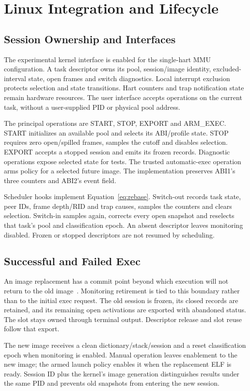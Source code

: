 \section{Linux Integration and Lifecycle}
\label{sec:linux}
\subsection{Session Ownership and Interfaces}
The experimental kernel interface is enabled for the single-hart MMU configuration. A task descriptor owns its pool, session/image identity, excluded-interval state, open frames and switch diagnostics. Local interrupt exclusion protects selection and state transitions. Hart counters and trap notification state remain hardware resources. The user interface accepts operations on the current task, without a user-supplied PID or physical pool address.

The principal operations are START, STOP, EXPORT and ARM\_EXEC. START initializes an available pool and selects its ABI/profile state. STOP requires zero open/spilled frames, samples the cutoff and disables selection. EXPORT accepts a stopped session and emits its frozen records. Diagnostic operations expose selected state for tests. The trusted automatic-exec operation arms policy for a selected future image. The implementation preserves ABI1's three counters and ABI2's event field.

Scheduler hooks implement Equation~\ref{eq:rebase}. Switch-out records task state, peer IDs, frame depth/RID and trap causes, samples the counters and clears selection. Switch-in samples again, corrects every open snapshot and reselects that task's pool and classification epoch. An absent descriptor leaves monitoring disabled. Frozen or stopped descriptors are not resumed by scheduling.

\subsection{Successful and Failed Exec}
An image replacement has a commit point beyond which execution will not return to the old image~\citep{linuxexec}. Monitoring retirement is tied to this boundary rather than to the initial exec request. The old session is frozen, its closed records are retained, and its remaining open activations are exported with abandoned status. The slot stays owned through terminal output. Descriptor release and slot reuse follow that export.

The new image receives a clean dictionary/stack/session and a reset classification epoch when monitoring is enabled. Manual operation leaves enablement to the new image; the armed launch policy enables it when the replacement ELF is ready. Session ID plus the kernel's image generation distinguishes results under the same PID and prevents old snapshots from entering the new session.

